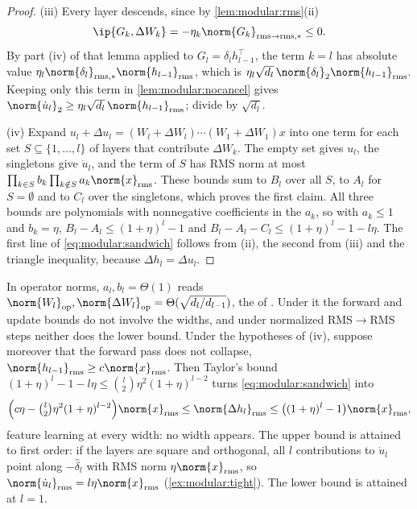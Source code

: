 \begin{refsection}
\begin{proof}
(iii) Every layer descends, since by \cref{lem:modular:rms}(ii)
\[
  \ip{G_k,\Delta W_k}=-\eta_k\norm{G_k}_{\rms\to\rms,*}\le0 .
\]
By part (iv) of that lemma applied to $G_l=\delta_lh_{l-1}^\top$, the term $k=l$ has absolute value $\eta_l\norm{\delta_l}_{\rms,*}\norm{h_{l-1}}_\rms$, which is $\eta_l\sqrt{d_l}\,\norm{\delta_l}_2\norm{h_{l-1}}_\rms$. Keeping only this term in \cref{lem:modular:nocancel} gives $\norm{\dot u_l}_2\ge\eta_l\sqrt{d_l}\,\norm{h_{l-1}}_\rms$; divide by $\sqrt{d_l}$.

(iv) Expand $u_l+\Delta u_l=(W_l+\Delta W_l)\cdots(W_1+\Delta W_1)x$ into one term for each set $S\subseteq\{1,\dots,l\}$ of layers that contribute $\Delta W_k$. The empty set gives $u_l$, the singletons give $\dot u_l$, and the term of $S$ has RMS norm at most $\prod_{k\in S}b_k\prod_{k\notin S}a_k\norm{x}_\rms$. These bounds sum to $B_l$ over all $S$, to $A_l$ for $S=\emptyset$ and to $C_l$ over the singletons, which proves the first claim. All three bounds are polynomials with nonnegative coefficients in the $a_k$, so with $a_k\le1$ and $b_k=\eta$, $B_l-A_l\le(1+\eta)^l-1$ and $B_l-A_l-C_l\le(1+\eta)^l-1-l\eta$. The first line of \eqref{eq:modular:sandwich} follows from (ii), the second from (iii) and the triangle inequality, because $\Delta h_l=\Delta u_l$.
\end{proof}

In operator norms, $a_l,b_l=\Theta(1)$ reads $\norm{W_l}_{\op},\norm{\Delta W_l}_{\op}=\Theta(\sqrt{d_l/d_{l-1}})$, the  of \textcite{YangSimonBernstein2023}. Under it the forward and update bounds do not involve the widths, and under normalized RMS$\to$RMS steps neither does the lower bound. Under the hypotheses of (iv), suppose moreover that the forward pass does not collapse, $\norm{h_{l-1}}_\rms\ge c\norm{x}_\rms$. Then Taylor's bound $(1+\eta)^l-1-l\eta\le\binom l2\eta^2(1+\eta)^{l-2}$ turns \eqref{eq:modular:sandwich} into
\begin{equation}\label{eq:modular:featurelearning}
  \Bigl(c\eta-\tbinom l2\eta^2(1+\eta)^{l-2}\Bigr)\norm{x}_\rms\le\norm{\Delta h_l}_\rms\le\bigl((1+\eta)^l-1\bigr)\norm{x}_\rms ,
\end{equation}
feature learning at every width: no width appears. The upper bound is attained to first order: if the layers are square and orthogonal, all $l$ contributions to $\dot u_l$ point along $-\hat\delta_l$ with RMS norm $\eta\norm{x}_\rms$, so $\norm{\dot u_l}_\rms=l\eta\norm{x}_\rms$ (\cref{ex:modular:tight}). The lower bound is attained at $l=1$.


\end{refsection}
